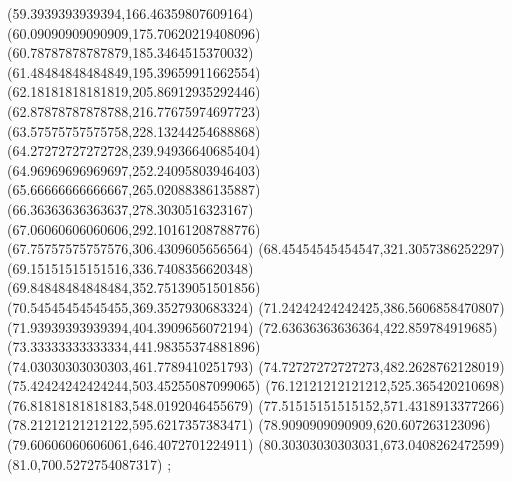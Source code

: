 {(59.3939393939394,166.46359807609164)
(60.09090909090909,175.70620219408096)
(60.78787878787879,185.3464515370032)
(61.48484848484849,195.39659911662554)
(62.18181818181819,205.86912935292446)
(62.87878787878788,216.77675974697723)
(63.57575757575758,228.13244254688868)
(64.27272727272728,239.94936640685404)
(64.96969696969697,252.24095803946403)
(65.66666666666667,265.02088386135887)
(66.36363636363637,278.3030516323167)
(67.06060606060606,292.10161208788776)
(67.75757575757576,306.4309605656564)
(68.45454545454547,321.3057386252297)
(69.15151515151516,336.7408356620348)
(69.84848484848484,352.75139051501856)
(70.54545454545455,369.3527930683324)
(71.24242424242425,386.5606858470807)
(71.93939393939394,404.3909656072194)
(72.63636363636364,422.859784919685)
(73.33333333333334,441.98355374881896)
(74.03030303030303,461.7789410251793)
(74.72727272727273,482.2628762128019)
(75.42424242424244,503.45255087099065)
(76.12121212121212,525.365420210698)
(76.81818181818183,548.0192046455679)
(77.51515151515152,571.4318913377266)
(78.21212121212122,595.6217357383471)
(78.9090909090909,620.607263123096)
(79.60606060606061,646.4072701224911)
(80.30303030303031,673.0408262472599)
(81.0,700.5272754087317)
};
